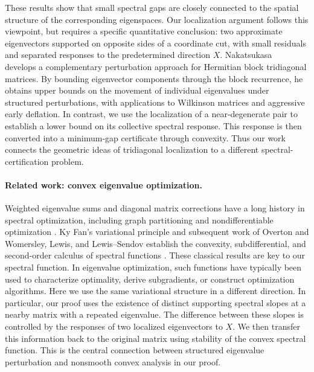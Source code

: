 \documentclass[10pt,a4paper]{article}
\begin{document}
These results show that small spectral gaps
are closely connected to the spatial structure
of the corresponding eigenspaces. Our localization
argument follows this viewpoint, but requires a
specific quantitative conclusion: two approximate
eigenvectors supported on opposite sides of
a coordinate cut, with small residuals and
separated responses to the predetermined
direction $X$. 
Nakatsukasa~\cite{Nakatsukasa2012} develops
a complementary perturbation approach for
Hermitian block tridiagonal matrices. By
bounding eigenvector components through the
block recurrence, he obtains upper bounds
on the movement of individual eigenvalues
under structured perturbations, with applications
to Wilkinson matrices and aggressive early
deflation. In contrast, we use the localization
of a near-degenerate pair to establish a lower
bound on its collective spectral response.
This response is then converted into a
minimum-gap certificate through convexity.
Thus our work connects the geometric ideas
of tridiagonal localization to a different
spectral-certification problem.

\paragraph{Related work: convex eigenvalue optimization.}
Weighted eigenvalue sums and diagonal matrix
corrections have a long history in spectral
optimization, including graph partitioning
and nondifferentiable optimization
\cite{DonathHoffman1973,CullumDonathWolfe1975,
LewisOverton1996}.
Ky Fan's variational principle and subsequent
work of Overton and Womersley, Lewis, and
Lewis--Sendov establish the convexity,
subdifferential, and second-order calculus
of spectral functions
\cite{Fan1949,OvertonWomersley1992,
OvertonWomersley1993,Lewis1996Convex,
Lewis1996Derivatives,LewisSendov2001}. 
These classical results are key to our spectral function. In eigenvalue
optimization, such functions have typically
been used to characterize optimality, derive
subgradients, or construct optimization
algorithms. Here we use the same variational
structure in a different direction. 
In particular, our proof uses the existence
of distinct supporting spectral slopes at
a nearby matrix with a repeated eigenvalue.
The difference between these slopes is
controlled by the responses of two localized
eigenvectors to $X$. We then transfer this
information back to the original matrix
using stability of the convex spectral
function. This is the central connection
between structured eigenvalue perturbation
and nonsmooth convex analysis in our proof. 
\end{document}
